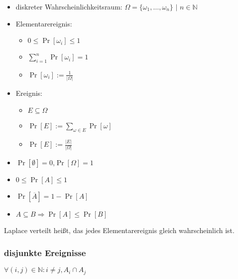 \documentclass[a4,12pt]{scrartcl}
\begin{document}
\begin{itemize}
\item diskreter Wahrscheinlichkeitsraum: $\Omega = \{\omega_1,\ldots,\omega_n\}$ $|$ $n\in \mathbb{N}$
\item Elementarereignis:\\
	\begin{itemize}
	\item $0 \leq \Pr[\omega_i]\leq 1$
	\item $\sum_{i=1}^n\Pr[\omega_i]=1$
	\item $\Pr[\omega_i]:=\frac{1}{|\Omega|}$
	\end{itemize}
\item Ereignis:\\
	\begin{itemize}
	\item $E\subseteq\Omega$
	\item $\Pr[E]:=\sum_{\omega\in E}\Pr[\omega]$
	\item $\Pr[E]:=\frac{|E|}{|\Omega|}$
	\end{itemize}
\item $\Pr[\emptyset]=0$,$\Pr[\Omega]=1$ 
\item $0\leq \Pr[A] \leq 1$
\item $\Pr[\overline{A}]=1-\Pr[A]$
\item $A\subseteq B \Rightarrow \Pr[A]\leq \Pr[B]$
\end{itemize}

Laplace verteilt heißt, das jedes Elementarereignis gleich wahrscheinlich ist.

\subsubsection{disjunkte Ereignisse}
$\forall(i,j)\in\mathbb{N}: i\neq j, A_i\cap  A_j$
\end{document}
